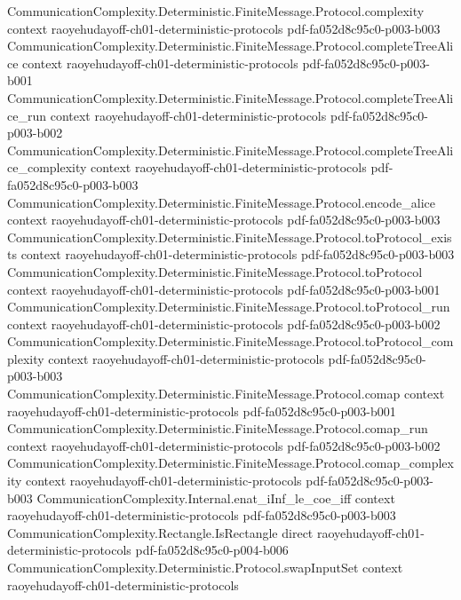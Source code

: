 \begin{theorem}
  {CommunicationComplexity.Deterministic.FiniteMessage.Protocol.complexity}
  {context}
  {raoyehudayoff-ch01-deterministic-protocols}
  {pdf-fa052d8c95c0-p003-b003}
\proofstep
  {CommunicationComplexity.Deterministic.FiniteMessage.Protocol.completeTreeAlice}
  {context}
  {raoyehudayoff-ch01-deterministic-protocols}
  {pdf-fa052d8c95c0-p003-b001}
\proofstep
  {CommunicationComplexity.Deterministic.FiniteMessage.Protocol.completeTreeAlice_run}
  {context}
  {raoyehudayoff-ch01-deterministic-protocols}
  {pdf-fa052d8c95c0-p003-b002}
\proofstep
  {CommunicationComplexity.Deterministic.FiniteMessage.Protocol.completeTreeAlice_complexity}
  {context}
  {raoyehudayoff-ch01-deterministic-protocols}
  {pdf-fa052d8c95c0-p003-b003}
\proofstep
  {CommunicationComplexity.Deterministic.FiniteMessage.Protocol.encode_alice}
  {context}
  {raoyehudayoff-ch01-deterministic-protocols}
  {pdf-fa052d8c95c0-p003-b003}
\proofstep
  {CommunicationComplexity.Deterministic.FiniteMessage.Protocol.toProtocol_exists}
  {context}
  {raoyehudayoff-ch01-deterministic-protocols}
  {pdf-fa052d8c95c0-p003-b003}
\proofstep
  {CommunicationComplexity.Deterministic.FiniteMessage.Protocol.toProtocol}
  {context}
  {raoyehudayoff-ch01-deterministic-protocols}
  {pdf-fa052d8c95c0-p003-b001}
\proofstep
  {CommunicationComplexity.Deterministic.FiniteMessage.Protocol.toProtocol_run}
  {context}
  {raoyehudayoff-ch01-deterministic-protocols}
  {pdf-fa052d8c95c0-p003-b002}
\proofstep
  {CommunicationComplexity.Deterministic.FiniteMessage.Protocol.toProtocol_complexity}
  {context}
  {raoyehudayoff-ch01-deterministic-protocols}
  {pdf-fa052d8c95c0-p003-b003}
\proofstep
  {CommunicationComplexity.Deterministic.FiniteMessage.Protocol.comap}
  {context}
  {raoyehudayoff-ch01-deterministic-protocols}
  {pdf-fa052d8c95c0-p003-b001}
\proofstep
  {CommunicationComplexity.Deterministic.FiniteMessage.Protocol.comap_run}
  {context}
  {raoyehudayoff-ch01-deterministic-protocols}
  {pdf-fa052d8c95c0-p003-b002}
\proofstep
  {CommunicationComplexity.Deterministic.FiniteMessage.Protocol.comap_complexity}
  {context}
  {raoyehudayoff-ch01-deterministic-protocols}
  {pdf-fa052d8c95c0-p003-b003}
\proofstep
  {CommunicationComplexity.Internal.enat_iInf_le_coe_iff}
  {context}
  {raoyehudayoff-ch01-deterministic-protocols}
  {pdf-fa052d8c95c0-p003-b003}
\proofstep
  {CommunicationComplexity.Rectangle.IsRectangle}
  {direct}
  {raoyehudayoff-ch01-deterministic-protocols}
  {pdf-fa052d8c95c0-p004-b006}
\proofstep
  {CommunicationComplexity.Deterministic.Protocol.swapInputSet}
  {context}
  {raoyehudayoff-ch01-deterministic-protocols}

\end{theorem}
